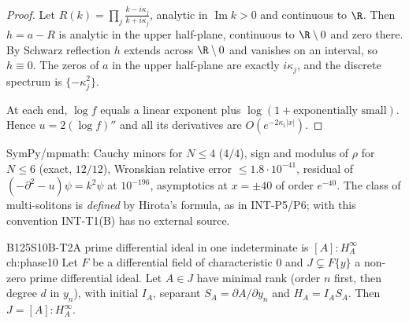 \begin{proof}
Let $R(k)=\prod_j\frac{k-i\kappa_j}{k+i\kappa_j}$, analytic in $\operatorname{Im}k>0$ and continuous to $\R$. Then $h=a-R$ is analytic in the upper half-plane, continuous to $\R\setminus0$ and zero there. By Schwarz reflection $h$ extends across $\R\setminus0$ and vanishes on an interval, so $h\equiv0$. The zeros of $a$ in the upper half-plane are exactly $i\kappa_j$, and the discrete spectrum is $\{-\kappa_j^2\}$.

At each end, $\log f$ equals a linear exponent plus $\log(1+\text{exponentially small})$. Hence $u=2(\log f)''$ and all its derivatives are $O(e^{-2\kappa_1|x|})$.

\end{proof}

\begin{caution}[title=Checks and convention]
SymPy/mpmath: Cauchy minors for $N\le4$ ($4/4$), sign and modulus of $\rho$ for $N\le6$ (exact, $12/12$), Wronskian relative error $\le1.8\cdot10^{-41}$, residual of $(-\partial^2-u)\psi=k^2\psi$ at $10^{-196}$, asymptotics at $x=\pm40$ of order $e^{-40}$. The class of multi-solitons is \emph{defined} by Hirota's formula, as in INT-P5/P6; with this convention INT-T1(B) has no external source.
\end{caution}

\begin{dimcard}{B125}{S10B-T2}{A prime differential ideal in one indeterminate is $[A]:H_A^\infty$}{\pw}{ch:phase10}
Let $F$ be a differential field of characteristic $0$ and $J\subsetneq F\{y\}$ a non-zero prime differential ideal. Let $A\in J$ have minimal rank (order $n$ first, then degree $d$ in $y_n$), with initial $I_A$, separant $S_A=\partial A/\partial y_n$ and $H_A=I_AS_A$. Then $J=[A]:H_A^\infty$.
\end{dimcard}

